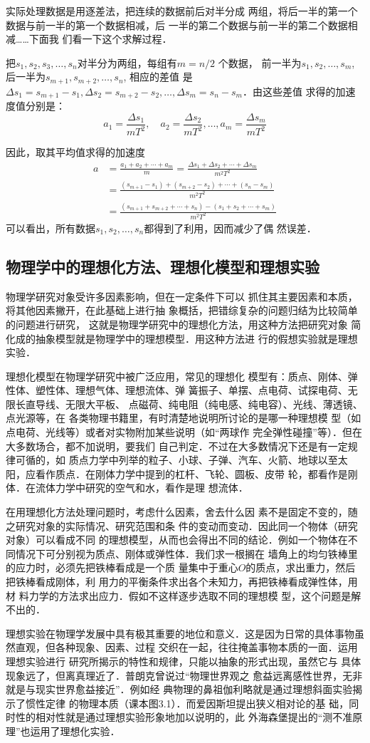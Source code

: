 实际处理数据是用逐差法，把连续的数据前后对半分成
两组，将后一半的第一个数据与前一半的第一个数据相减，后
一半的第二个数据与前一半的第二个数据相减……下面我
们看一下这个求解过程．

把$s_1,s_2,s_3,\ldots,s_n$对半分为两组，每组有$m=n/2$
个数据，
前一半为$s_1,s_2,\ldots,s_m$, 后一半为$s_{m+1},s_{m+2},\ldots,s_n$, 相应的差值
是$\Delta s_1=s_{m+1}-s_1,\Delta s_2=s_{m+2}-s_2,\ldots, \Delta s_m=s_{n}-s_m$．由这些差值
求得的加速度值分别是：
\[a_1=\frac{\Delta s_1}{mT^2},\quad a_2=\frac{\Delta s_2}{mT^2},\ldots, a_m=\frac{\Delta s_m}{mT^2} \]

因此，取其平均值求得的加速度
\[\begin{split}
   a&=\frac{a_1+a_2+\cdots+a_m}{m}=\frac{\Delta s_1+\Delta s_2+\cdots+\Delta s_m}{m^2T^2}\\
   &=\frac{(s_{m+1}-s_1)+(s_{m+2}-s_2)+\cdots+(s_{n}-s_m)}{m^2T^2}\\
   &=\frac{(s_{m+1}+s_{m+2}+\cdots+s_n)-(s_1+s_2+\cdots+s_m)}{m^2T^2} 
\end{split}\]
可以看出，所有数据$s_1,s_2,\ldots,s_n$都得到了利用，因而减少了偶
然误差．

\subsection{物理学中的理想化方法、理想化模型和理想实验}

物理学研究对象受许多因素影响，但在一定条件下可以
抓住其主要因素和本质，将其他因素撇开，在此基础上进行抽
象概括，把错综复杂的问题归结为比较简单的问题进行研究，
这就是物理学研究中的理想化方法，用这种方法把研究对象
简化成的抽象模型就是物理学中的理想模型．用这种方法进
行的假想实验就是理想实验．

理想化模型在物理学研究中被广泛应用，常见的理想化
模型有：质点、刚体、弹性体、塑性体、理想气体、理想流体、弹
簧振子、单摆、点电荷、试探电荷、无限长直导线、无限大平板、
点磁荷、纯电阻（纯电感、纯电容）、光线、薄透镜、点光源等，在
各类物理书籍里，有时清楚地说明所讨论的是哪一种理想模
型（如点电荷、光线等）或者对实物附加某些说明（如“两球作
完全弹性碰撞”等）．但在大多数场合，都不加说明，要我们
自己判定．不过在大多数情况下还是有一定规律可循的，如
质点力学中列举的粒子、小球、子弹、汽车、火箭、地球以至太
阳，应看作质点．在刚体力学中提到的杠杆、飞轮、圆板、皮带
轮，都看作是刚体．在流体力学中研究的空气和水，看作是理
想流体．

在用理想化方法处理问题时，考虑什么因素，舍去什么因
素不是固定不变的，随之研究对象的实际情况、研究范围和条
件的变动而变动．因此同一个物体（研究对象）可以看成不同
的理想模型，从而也会得出不同的结论．例如一个物体在不
同情况下可分别视为质点、刚体或弹性体．我们求一根搁在
墙角上的均匀铁棒里的应力时，必须先把铁棒看成是一个质
量集中于重心$O$的质点，求出重力，然后把铁棒看成刚体，利
用力的平衡条件求出各个未知力，再把铁棒看成弹性体，用材
料力学的方法求出应力．假如不这样逐步选取不同的理想模
型，这个问题是解不出的．

理想实验在物理学发展中具有极其重要的地位和意义．这是因为日常的具体事物虽然直观，但各种现象、因素、过程
交织在一起，往往掩盖事物本质的一面．运用理想实验进行
研究所揭示的特性和规律，只能以抽象的形式出现，虽然它与
具体现象远了，但离真理近了．普朗克曾说过“物理世界观之
愈益远离感性世界，无非就是与现实世界愈益接近”．例如经
典物理的鼻祖伽利略就是通过理想斜面实验揭示了惯性定律
的物理本质（课本图3.1）．而爱因斯坦提出狭义相对论的基
础，同时性的相对性就是通过理想实验形象地加以说明的，此
外海森堡提出的“测不准原理”也运用了理想化实验．





